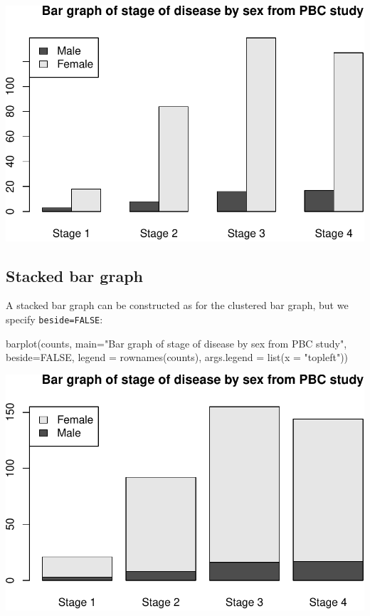 \documentclass[
]{memoir}
\newenvironment{Shaded}{\begin{snugshade}}{\end{snugshade}}
\newcommand{\AttributeTok}[1]{\textcolor[rgb]{0.77,0.63,0.00}{#1}}
\newcommand{\ConstantTok}[1]{\textcolor[rgb]{0.00,0.00,0.00}{#1}}
\newcommand{\FunctionTok}[1]{\textcolor[rgb]{0.00,0.00,0.00}{#1}}
\newcommand{\NormalTok}[1]{#1}
\newcommand{\StringTok}[1]{\textcolor[rgb]{0.31,0.60,0.02}{#1}}
\begin{document}
\includegraphics{phcm9795-R-notes_files/figure-latex/unnamed-chunk-44-1.pdf}

\hypertarget{stacked-bar-graph}{%
\subsection{Stacked bar graph}\label{stacked-bar-graph}}

A stacked bar graph can be constructed as for the clustered bar graph, but we specify \texttt{beside=FALSE}:

\begin{Shaded}
\begin{Highlighting}[]
\FunctionTok{barplot}\NormalTok{(counts, }\AttributeTok{main=}\StringTok{"Bar graph of stage of disease by sex from PBC study"}\NormalTok{,}
        \AttributeTok{beside=}\ConstantTok{FALSE}\NormalTok{, }\AttributeTok{legend =} \FunctionTok{rownames}\NormalTok{(counts), }\AttributeTok{args.legend =} \FunctionTok{list}\NormalTok{(}\AttributeTok{x =} \StringTok{"topleft"}\NormalTok{))}
\end{Highlighting}
\end{Shaded}

\includegraphics{phcm9795-R-notes_files/figure-latex/unnamed-chunk-45-1.pdf}
\end{document}
